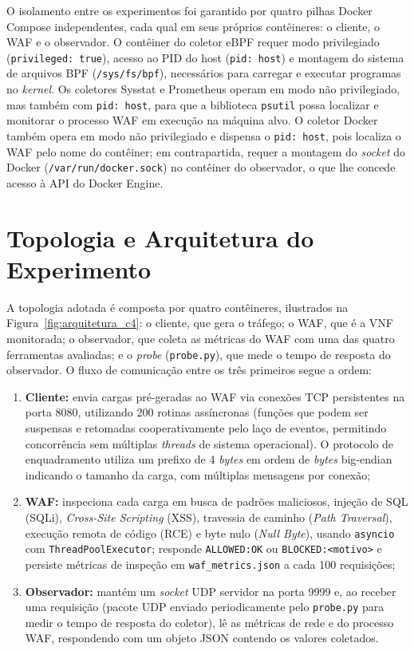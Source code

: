O isolamento entre os experimentos foi garantido por quatro pilhas Docker Compose independentes, cada qual em seus próprios contêineres: o cliente, o WAF e o observador. O contêiner do coletor eBPF requer modo privilegiado (\texttt{privileged: true}), acesso ao PID do host (\texttt{pid: host}) e montagem do sistema de arquivos BPF (\texttt{/sys/fs/bpf}), necessários para carregar e executar programas no \textit{kernel}. Os coletores Sysstat e Prometheus operam em modo não privilegiado, mas também com \texttt{pid: host}, para que a biblioteca \texttt{psutil} possa localizar e monitorar o processo WAF em execução na máquina alvo. O coletor Docker também opera em modo não privilegiado e dispensa o \texttt{pid: host}, pois localiza o WAF pelo nome do contêiner; em contrapartida, requer a montagem do \textit{socket} do Docker (\texttt{/var/run/docker.sock}) no contêiner do observador, o que lhe concede acesso à API do Docker Engine.

\section{Topologia e Arquitetura do Experimento}

A topologia adotada é composta por quatro contêineres, ilustrados na Figura~\ref{fig:arquitetura_c4}: o cliente, que gera o tráfego; o WAF, que é a VNF monitorada; o observador, que coleta as métricas do WAF com uma das quatro ferramentas avaliadas; e o \textit{probe} (\texttt{probe.py}), que mede o tempo de resposta do observador. O fluxo de comunicação entre os três primeiros segue a ordem:

\begin{enumerate}
    \item \textbf{Cliente:} envia cargas pré-geradas ao WAF via conexões TCP persistentes na porta 8080, utilizando 200 rotinas assíncronas (funções que podem ser suspensas e retomadas cooperativamente pelo laço de eventos, permitindo concorrência sem múltiplas \textit{threads} de sistema operacional). O protocolo de enquadramento utiliza um prefixo de 4 \textit{bytes} em ordem de \textit{bytes} big-endian indicando o tamanho da carga, com múltiplas mensagens por conexão;
    \item \textbf{WAF:} inspeciona cada carga em busca de padrões maliciosos, injeção de SQL (SQLi), \textit{Cross-Site Scripting} (XSS), travessia de caminho (\textit{Path Traversal}), execução remota de código (RCE) e byte nulo (\textit{Null Byte}), usando \texttt{asyncio} com \texttt{Thread\-Pool\-Executor}; responde \texttt{ALLOWED:OK} ou \texttt{BLOCKED:\-<mo\-ti\-vo>} e persiste métricas de inspeção em \texttt{waf\_met\-rics.\-json} a cada 100 requisições;
    \item \textbf{Observador:} mantém um \textit{socket} UDP servidor na porta 9999 e, ao receber uma requisição (pacote UDP enviado periodicamente pelo \texttt{probe.py} para medir o tempo de resposta do coletor), lê as métricas de rede e do processo WAF, respondendo com um objeto JSON contendo os valores coletados.
\end{enumerate}

